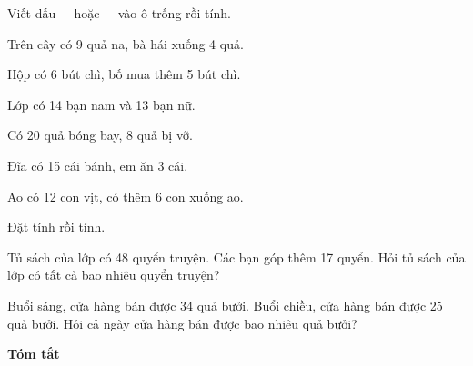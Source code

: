 \documentclass[../main.tex]{subfiles}
\begin{document}
\begin{bt}
    Viết dấu $+$ hoặc $-$ vào ô trống rồi tính.
    \begin{listEX}
        \item Trên cây có 9 quả na, bà hái xuống 4 quả. 
        \item Hộp có 6 bút chì, bố mua thêm 5 bút chì. 
        \item Lớp có 14 bạn nam và 13 bạn nữ. 
        \item Có 20 quả bóng bay, 8 quả bị vỡ. 
        \item Đĩa có 15 cái bánh, em ăn 3 cái. 
        \item Ao có 12 con vịt, có thêm 6 con xuống ao. 
    \end{listEX}
\end{bt}

\begin{bt}
    Đặt tính rồi tính.
    \par\nopagebreak\vspace{4pt}
\end{bt}
\newpage
\begin{bt}
    Tủ sách của lớp có 48 quyển truyện. Các bạn góp thêm 17 quyển. Hỏi tủ sách của lớp có tất cả bao nhiêu quyển truyện?
\end{bt}

\begin{bt}
    Buổi sáng, cửa hàng bán được 34 quả bưởi. Buổi chiều, cửa hàng bán được 25 quả bưởi. Hỏi cả ngày cửa hàng bán được bao nhiêu quả bưởi?
    \par{}
    \noindent\begin{minipage}[t]{0.36\linewidth}
        \textbf{Tóm tắt}
    \end{minipage}\hfill
    \begin{minipage}[t]{0.6\linewidth}
    \end{minipage}
\end{bt}
\end{document}
